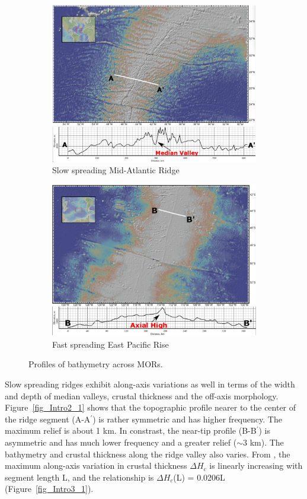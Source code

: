 \begin{figure}[H]
\centering
\begin{subfigure}{.5\textwidth}
  \centering
  \includegraphics[width=.8\linewidth]{./Figures/fig_Intro1_1.png}
  \caption{\small{Slow spreading Mid-Atlantic Ridge}}
  \label{fig_Intro1_1}
\end{subfigure}%
\begin{subfigure}{.5\textwidth}
  \centering
  \includegraphics[width=.8\linewidth]{./Figures/fig_Intro1_3.png}
  \caption{\small{Fast spreading East Pacific Rise}}
  \label{fig_Intro1_3}
\end{subfigure}
\caption{\small{Profiles of bathymetry across MORs.}}
\label{fig_Intro1_3}
\end{figure}
Slow spreading ridges exhibit along-axis variations as well in terms of the width and depth of median valleys, crustal thickness and the off-axis morphology.  Figure~\ref{fig_Intro2_1} shows that the topographic profile nearer to the center of the ridge segment (A-A$^{\prime}$) is rather symmetric and has higher frequency. The maximum relief is about 1 km. In constrast, the near-tip profile (B-B$^{\prime}$) is asymmetric and has much lower frequency and a greater relief ($\sim$3 km). The bathymetry and crustal thickness along the ridge valley also varies. From \citep{Chen1999}, the maximum along-axis variation in crustal thickness $\Delta H_{c}$ is linearly increasing with segment length L, and the relationship is $\Delta H_{c}$(L) = 0.0206L (Figure~\ref{fig_Intro3_1}).

